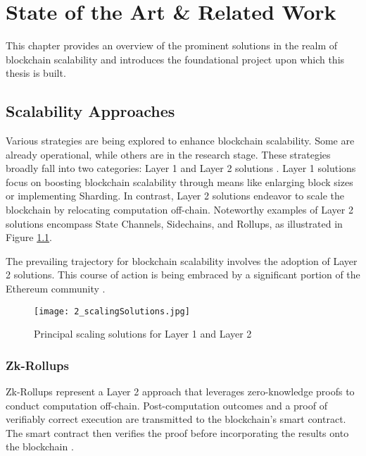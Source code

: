 \chapter{State of the Art \& Related Work}
\label{cha:chapter2}

This chapter provides an overview of the prominent solutions in the realm of blockchain scalability and introduces the foundational project upon which this thesis is built.

\section{Scalability Approaches}
Various strategies are being explored to enhance blockchain scalability. Some are already operational, while others are in the research stage. These strategies broadly fall into two categories: Layer 1 and Layer 2 solutions \cite{tyagi_study_2021,thibault_blockchain_2022}. Layer 1 solutions focus on boosting blockchain scalability through means like enlarging block sizes or implementing Sharding. In contrast, Layer 2 solutions endeavor to scale the blockchain by relocating computation off-chain. Noteworthy examples of Layer 2 solutions encompass State Channels, Sidechains, and Rollups, as illustrated in Figure \ref{fig:2_scalingSolutions}.

The prevailing trajectory for blockchain scalability involves the adoption of Layer 2 solutions. This course of action is being embraced by a significant portion of the Ethereum community \cite{neiheiser_practical_2023}.

\begin{figure}[ht]
  \centering
  \texttt{[image: 2\_scalingSolutions.jpg]}
  \caption[Scaling Solutions]{Principal scaling solutions for Layer 1 and Layer 2\footnotemark}  
  \label{fig:2_scalingSolutions}
\end{figure} 

\subsection{Zk-Rollups}
\label{sec:2_zkRollups}
Zk-Rollups represent a Layer 2 approach that leverages zero-knowledge proofs to conduct computation off-chain. Post-computation outcomes and a proof of verifiably correct execution are transmitted to the blockchain's smart contract. The smart contract then verifies the proof before incorporating the results onto the blockchain \cite{tyagi_study_2021}.

